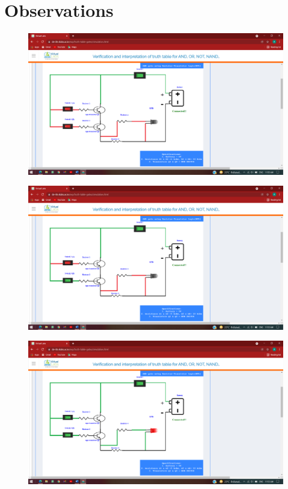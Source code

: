 \section{Observations}
	\begin{figure}[h]
		\centering
		\includegraphics[width=0.9\linewidth]{img/exp1/4}
		\caption{}
		\label{fig:1:4}
	\end{figure}
		\begin{figure}[h]
		\centering
		\includegraphics[width=0.9\linewidth]{img/exp1/5}
		\caption{}
		\label{fig:1:5}
	\end{figure}
		\begin{figure}[h]
		\centering
		\includegraphics[width=0.9\linewidth]{img/exp1/6}
		\caption{}
		\label{fig:1:6}
	\end{figure}
